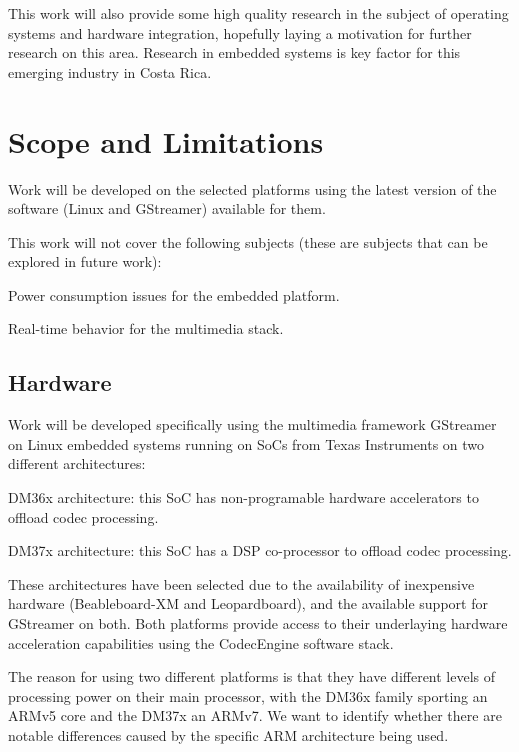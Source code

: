 This work will also provide some high quality research in the subject of operating systems and hardware integration, hopefully laying a motivation for further research on this area. Research in embedded systems is key factor for this emerging industry in Costa Rica.

\section{Scope and Limitations}
Work will be developed on the selected platforms using the latest version of the software (Linux and GStreamer) available for them.

This work will not cover the following subjects (these are subjects that can be explored in future work):
\begin{itemize*}
\item Power consumption issues for the embedded platform.
\item Real-time behavior for the multimedia stack.
\end{itemize*}

\subsection{Hardware}
Work will be developed specifically using the multimedia framework GStreamer on Linux embedded systems running on \acp{SoC} from Texas Instruments on two different architectures:
\begin{itemize*}
\item DM36x architecture: this \ac{SoC} has non-programable hardware accelerators to offload codec processing.
\item DM37x architecture: this \ac{SoC} has a \ac{DSP} co-processor to offload codec processing.
\end{itemize*}

These architectures have been selected due to the availability of inexpensive hardware (Beableboard-XM and Leopardboard), and the available support for GStreamer on both. Both platforms provide access to their underlaying hardware acceleration capabilities using the CodecEngine software stack\cite{Preissig:2006fk}.

The reason for using two different platforms is that they have different levels of processing power on their main processor, with the DM36x family sporting an ARMv5 core and the DM37x an ARMv7. We want to identify whether there are notable differences caused by the specific ARM architecture being used.
